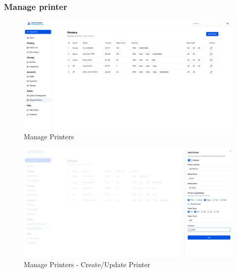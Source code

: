 \subsubsection{Manage printer}

\begin{figure}[H]
    \centering
    \includegraphics[max width = 0.9\linewidth,origin = c]{chapters/8. Implementation - Sprint 2/11. manage printers.png}
    \caption{Manage Printers}%
\end{figure}
\begin{figure}[H]
    \centering
    \includegraphics[max width = 0.9\linewidth,origin = c]{chapters/8. Implementation - Sprint 2/12. manage printers - form.png}
    \caption{Manage Printers - Create/Update Printer}%
\end{figure}